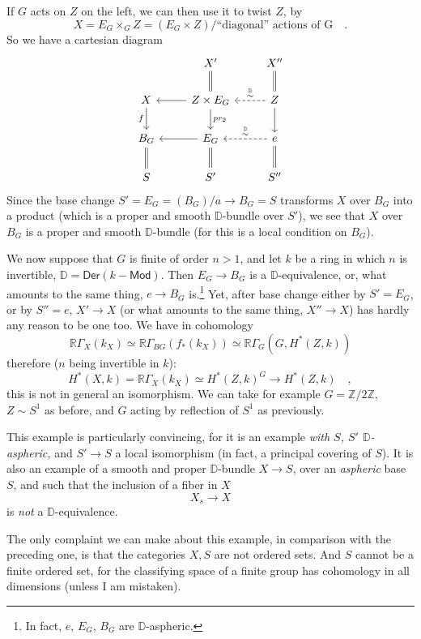 \documentclass[11pt]{article}
\newcommand{\printedpage}[1]{\marginpar{\footnotesize p.~#1}}
\newcommand{\msp}[1]{\marginpar{\footnotesize [#1]}}
\newcommand{\D}{\mathbb{D}}
\newcommand{\RR}{\mathbb{R}}
\begin{document}
\printedpage{56}

\msp{page 91}
If $G$ acts on $Z$ on the left, we can then use it to twist $Z$, by
\[ X = E_G \times_G Z = (E_G \times Z)/\text{``diagonal'' actions of G} \quad . \]
So we have a cartesian diagram
\[
\begin{tikzcd}
 & X' \arrow[d, equal] & X'' \arrow[d, equal] \\
X \arrow[d, "f"'] & Z \times E_G \arrow[l] \arrow[d, "pr_2"] & Z \arrow[l, dashed, "{\overset{\D}{\sim}}"'] \arrow[d] \\
B_G \arrow[d, equal] & E_G \arrow[l] \arrow[d, equal] & e \arrow[l, dashed, "{\overset{\D}{\sim}}"'] \arrow[d, equal] \\
S & S' & S''
\end{tikzcd}
\]
Since the base change $S' = E_G = (B_G)/a \to B_G = S$ transforms $X$ over $B_G$ into a product (which is a proper and smooth $\D$-bundle over $S'$), we see that $X$ over $B_G$ is a proper and smooth $\D$-bundle (for this is a local condition on $B_G$).

We now suppose that $G$ is finite of order $n > 1$, and let $k$ be a ring in which $n$ is invertible, $\D = \mathsf{Der}(k - \mathsf{Mod})$. Then $E_G \to B_G$ is a $\D$-equivalence, or, what amounts to the same thing, $e \to B_G$ is.\footnote[47]{In fact, $e$, $E_G$, $B_G$ are $\D$-aspheric.} Yet, after base change either by $S' = E_G$, or by $S'' = e$, $X' \to X$ (or what amounts to the same thing, $X'' \to X$) has hardly any reason to be one too. We have in cohomology %
\[ \RR\Gamma_X(k_X) \simeq \RR\Gamma_{BG}(f_*(k_X)) \simeq \RR\Gamma_G(G, H^*(Z,k)) \]
\msp{page 92}
therefore ($n$ being invertible in $k$):
\[ H^*(X,k) = \RR\Gamma_X(k_X) \simeq H^*(Z,k)^G \longrightarrow H^*(Z,k) \quad , \]
this is not in general an isomorphism. We can take for example $G = \mathbb{Z}/2\mathbb{Z}$, $Z \sim S^1$ as before, and $G$ acting by reflection of $S^1$ as previously.

This example is particularly convincing, for it is an example \textit{with $S$, $S'$ $\D$-aspheric,} and $S' \to S$ a local isomorphism (in fact, a principal covering of $S$). It is also an example of a smooth and proper $\D$-bundle $X \to S$, over an \textit{aspheric} base $S$, and such that the inclusion of a fiber in $X$ %
\[ X_s \longrightarrow X \]
is \textit{not} a $\D$-equivalence.

The only complaint we can make about this example, in comparison with the preceding one, is that the categories $X, S$ are not ordered sets. And $S$ cannot be a finite ordered set, for the classifying space of a finite group has cohomology in all dimensions (unless I am mistaken).
\end{document}
